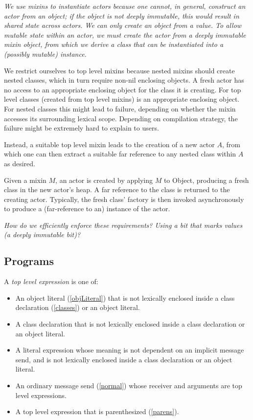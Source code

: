 \documentclass{article}
\begin{document}
{\it
We use mixins to instantiate actors because one cannot, in general, construct an actor from an object; if the object is not deeply immutable, this would result in shared state across actors.  We can only create an object from a value. To allow mutable state within an actor, we must create the actor from a deeply immutable mixin object, from which we  derive a class that can be instantiated into a (possibly mutable) instance.

We restrict ourselves to top level mixins because nested mixins  should create nested classes, which in turn require non-nil enclosing objects.  A fresh actor has no access to an appropriate enclosing object for the class it is creating. For top level classes (created from top level mixins) \NIL{} is an appropriate enclosing object. For nested classes this might lead to failure, depending on whether the mixin accesses its surrounding lexical scope.  Depending on compilation strategy, the failure might be extremely hard to explain to users.

Instead, a suitable top level mixin leads to the creation of a new actor $A$, from which one can then extract a suitable far reference to any nested class within $A$ as desired.
}

Given a mixin $M$, an actor is created by applying $M$ to Object, producing a fresh class in the new actor's heap. A far reference to the class is returned to the creating actor.  Typically, the fresh class'  factory is then invoked asynchronously to produce a (far-reference to an) instance of the actor.

{\it  
How do we efficiently enforce these requirements? Using a bit that marks values (a deeply immutable bit)?
}

\subsection{Programs}
\label{topLevel}

A {\em top level expression} is one of:
\begin{itemize}
\item An object literal (\ref{objLiteral}) that is not lexically enclosed inside a class declaration (\ref{classes}) or an object literal.
\item A class declaration that is not lexically enclosed inside a class declaration or an object literal.
\item A literal expression whose meaning is not dependent on an implicit message send, and is not lexically enclosed inside a class declaration or an object literal.
\item An ordinary message send (\ref{normal}) whose receiver and arguments are top level expressions.
\item A top level expression that is parenthesized (\ref{parens}).
\end{itemize}
\end{document}
